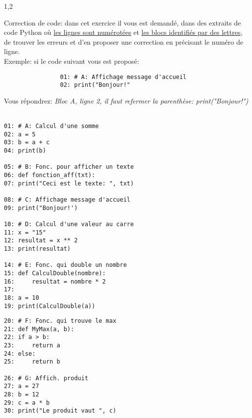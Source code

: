 \documentclass[11pt,a4paper]{exam}
\begin{document}
    \begin{questions} %
        \begin{spacing}{1,2}
    
            \question[14] Correction de code: dans cet exercice il vous est demandé, dans des extraits 
            de code Python où \uline{les lignes sont numérotées} et \uline{les blocs identifiés par des lettres}, de trouver les erreurs 
            et d'en proposer une correction en précisant le numéro de ligne.
            \\
            Exemple: si le code suivant vous est proposé:
            \begin{verbatim}
                01: # A: Affichage message d'accueil
                02: print("Bonjour!"
            \end{verbatim}
        	Vous répondrez: \hspace{1cm}\textit{Bloc A, ligne 2, il faut refermer la parenthèse: print("Bonjour!")}
            \leavevmode
            \\
            \\
            \noindent
            \begin{minipage}{0.5\textwidth}
                \begin{verbatim}
01: # A: Calcul d'une somme
02: a = 5
03: b = a + c
04: print(b)

05: # B: Fonc. pour afficher un texte
06: def fonction_aff(txt):
07: print("Ceci est le texte: ", txt)

08: # C: Affichage message d'accueil
09: print("Bonjour!')

10: # D: Calcul d'une valeur au carre
11: x = "15"
12: resultat = x ** 2
13: print(resultat)

14: # E: Fonc. qui double un nombre
15: def CalculDouble(nombre):
16:     resultat = nombre * 2
17:
18: a = 10
19: print(CalculDouble(a))
                \end{verbatim}
            \end{minipage}
            \begin{minipage}{0.5\textwidth}
                \begin{verbatim}
20: # F: Fonc. qui trouve le max
21: def MyMax(a, b):
22: if a > b:
23:     return a
24: else:
25:     return b

26: # G: Affich. produit
27: a = 27
28: b = 12
29: c = a * b
30: print("Le produit vaut ", c)


\end{verbatim}
\end{minipage}
\end{spacing}
\end{questions}
\end{document}
